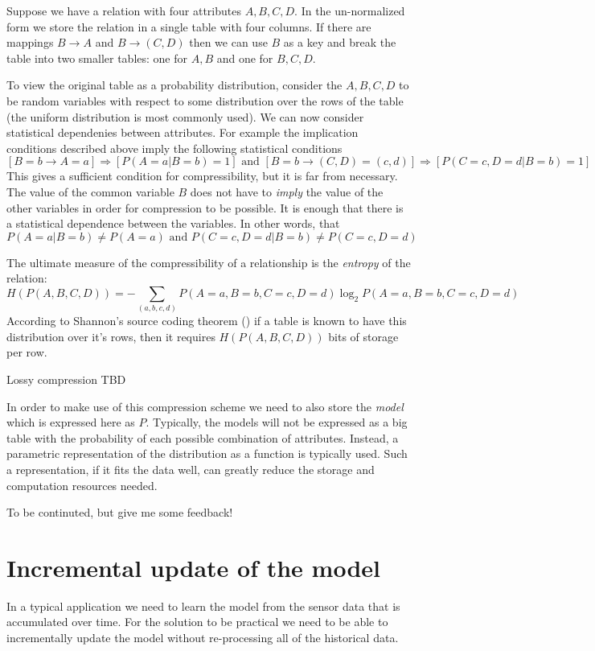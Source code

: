 Suppose we have a relation with four attributes $A,B,C,D$. In the
un-normalized form we store the relation in a single table with four
columns. If there are mappings $B \to A$ and $B \to (C,D)$ then we can
use $B$ as a key and break the table into two smaller tables: one for
$A,B$ and one for $B,C,D$. 

To view the original table as a probability distribution, consider the
$A,B,C,D$ to be random variables with respect to some distribution
over the rows of the table (the uniform distribution is most commonly
used). We can now consider statistical dependenies between
attributes. For example the implication conditions described above
imply the following statistical conditions
\[
\left[ B=b \to A=a\right] \Rightarrow \left[ P(A=a | B=b) =1 \right]
\mbox{ and }
\left[ B=b \to (C,D)=(c,d) \right] \Rightarrow \left[ P(C=c,D=d | B=b) =1 \right]
\]
This gives a sufficient condition for compressibility, but it is far
from necessary. The value of the common variable $B$ does not have 
to {\em imply} the value of the other variables in order for
compression to be possible. It is enough that there is a statistical
dependence between the variables. In other words, that
\[
P(A=a|B=b) \neq P(A=a) \mbox{ and } P(C=c,D=d|B=b) \neq P(C=c,D=d)
\]

The ultimate measure of the compressibility of a relationship is the
{\em entropy} of the relation:
\[
H(P(A,B,C,D))= - \sum_{(a,b,c,d)} P(A=a,B=b,C=c,D=d) \log_2 P(A=a,B=b,C=c,D=d)
\]
According to Shannon's source coding theorem (\cite{}) if a table is
known to have this distribution over it's rows, then it requires
$H(P(A,B,C,D))$ bits of storage per row.

Lossy compression TBD

In order to make use of this compression scheme we need to also store
the {\em model} which is expressed here as $P$. Typically, the models
will not be expressed as a big table with the probability of each
possible combination of attributes. Instead, a parametric
representation of the distribution as a function is typically
used. Such a representation, if it fits the data well, can greatly
reduce the storage and computation resources needed.

To be continuted, but give me some feedback!

\section{Incremental update of the model}
In a typical application we need to learn the model from the sensor
data that is accumulated over time. For the solution to be practical
we need to be able to incrementally update the model without
re-processing all of the historical data.

